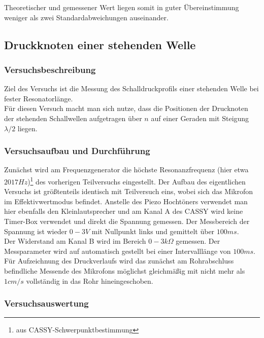 \documentclass[12pt,a4paper]{article}
\begin{document}
Theoretischer und gemessener Wert liegen somit in guter Übereinstimmung weniger als zwei Standardabweichungen auseinander.




\subsection{Druckknoten einer stehenden Welle}

\subsubsection{Versuchsbeschreibung}
Ziel des Versuchs ist die Messung des Schalldruckprofils einer stehenden Welle bei fester Resonatorlänge.\\
Für diesen Versuch macht man sich nutze, dass die Positionen der Drucknoten der stehenden Schallwellen aufgetragen über $n$ auf einer Geraden mit Steigung  $\lambda/2$ liegen.

\subsubsection{Versuchsaufbau und Durchführung}
Zunächst wird am Frequenzgenerator die höchste Resonanzfrequenz (hier etwa $2017Hz$)\footnote{aus CASSY-Schwerpunktbestimmung} des vorherigen Teilversuchs eingestellt.
Der Aufbau des eigentlichen Versuchs ist größtenteils identisch mit Teilversuch eins, wobei sich das Mikrofon im Effektivwertmodus befindet. Anstelle des Piezo Hochtöners verwendet man hier ebenfalls den Kleinlautsprecher und am Kanal A des CASSY wird keine Timer-Box verwendet und direkt die Spannung gemessen. Der Messbereich der Spannung ist wieder $0-3V$ mit Nullpunkt links und gemittelt über $100ms$.\\
Der Widerstand am Kanal B wird im Bereich $0-3k \Omega $ gemessen.
Der Messparameter wird auf automatisch gestellt bei einer Intervalllänge von $100ms$.\\
Für Aufzeichnung des Druckverlaufs wird das zunächst am Rohrabschluss  befindliche Messende des Mikrofons möglichst gleichmäßig mit nicht mehr als $1cm/s$ vollständig in das Rohr hineingeschoben.

\subsubsection{Versuchsauswertung}
\end{document}
